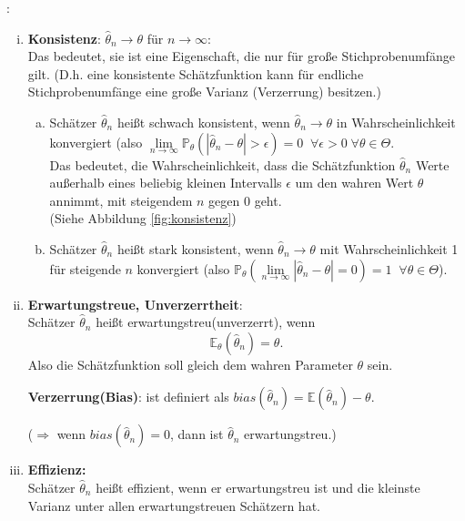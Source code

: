 \begin{definition}:\label{def:eigenschaften_schaetzer}
    \begin{enumerate}[i)]
        \item \textbf{Konsistenz}: $\hat\theta_n\rightarrow\theta$ für $n\rightarrow\infty$:\\
        Das bedeutet, sie ist eine Eigenschaft, die nur für große Stichprobenumfänge gilt. (D.h. eine konsistente Schätzfunktion kann für endliche Stichprobenumfänge eine große Varianz (Verzerrung) besitzen.)
        \begin{enumerate}[a)]
            \item Schätzer $\hat\theta_n$ heißt schwach konsistent, wenn $\hat\theta_n\to\theta$ in Wahrscheinlichkeit
                konvergiert (also $\lim\limits_{n\to\infty}\mathbb P_\theta(|\hat\theta_n-\theta|>\epsilon) = 0\;\;\forall\epsilon>0\;\forall\theta\in\Theta$.\\
                Das bedeutet, die Wahrscheinlichkeit, dass die Schätzfunktion $\hat\theta_n$ Werte außerhalb eines beliebig kleinen Intervalls $\epsilon$ um den wahren Wert $\theta$ annimmt, mit steigendem $n$ gegen 0 geht.\\
                (Siehe Abbildung \ref{fig:konsistenz})

            \item Schätzer $\hat\theta_n$ heißt stark konsistent, wenn $\hat\theta_n\to\theta$ mit Wahrscheinlichkeit
            1 für steigende $n$ konvergiert (also $\mathbb P_\theta(\lim\limits_{n\to\infty}|\hat\theta_n-\theta|=0)=1\;\;\forall\theta\in\Theta$).
        \end{enumerate}
        \item \textbf{Erwartungstreue, Unverzerrtheit}:\\
            Schätzer $\hat\theta_n$ heißt erwartungstreu(unverzerrt), wenn
            \[\mathbb E_\theta(\hat \theta_n)=\theta.\]
            Also die Schätzfunktion soll gleich dem wahren Parameter $\theta$ sein.

            \textbf{Verzerrung(Bias)}: ist definiert als $bias(\hat\theta_n)=\mathbb{E}(\hat\theta_n)-\theta$. 
            
            ($\Rightarrow$ wenn $bias(\hat\theta_n)=0$, dann ist $\hat\theta_n$ erwartungstreu.)
        \item \textbf{Effizienz:}\\
            Schätzer $\hat\theta_n$ heißt effizient, wenn er erwartungstreu ist und die kleinste Varianz
            unter allen erwartungstreuen Schätzern hat.


\end{enumerate}
\end{definition}
